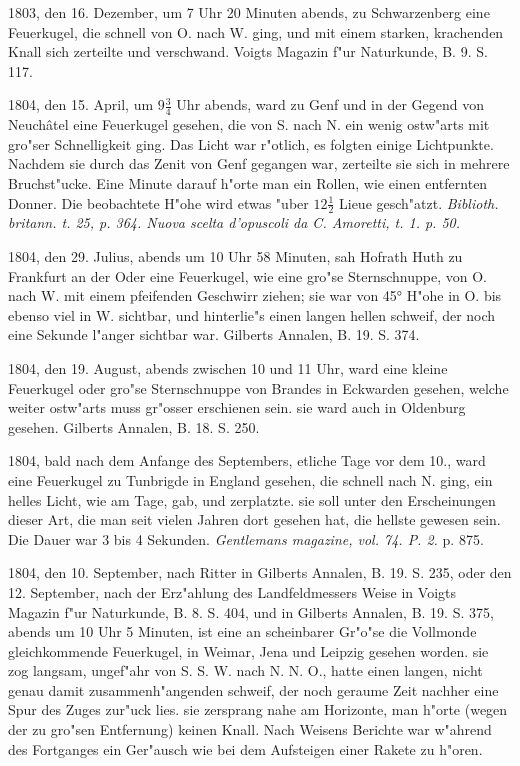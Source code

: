 \documentclass[a4paper, 11pt, oneside, polutonikogreek, german]{article}
\begin{document}
1803, den 16. Dezember, um 7 Uhr 20 Minuten abends, zu Schwarzenberg eine Feuerkugel, die schnell von O. nach W. ging, und mit einem starken, krachenden Knall sich zerteilte und verschwand. Voigts Magazin f"ur Naturkunde, B. 9. S. 117.

1804, den 15. April, um $\mathfrak{9\frac{3}{4}}$ Uhr abends, ward zu Genf und in der Gegend von Neuchâtel eine Feuerkugel gesehen, die von S. nach N. ein wenig ostw"arts mit gro"ser Schnelligkeit ging. Das Licht war r"otlich, es folgten einige Lichtpunkte. Nachdem sie durch das Zenit von Genf gegangen war, zerteilte sie sich in mehrere Bruchst"ucke. Eine Minute darauf h"orte man ein Rollen, wie einen entfernten Donner. Die beobachtete H"ohe wird etwas "uber $\mathfrak{12\frac{1}{2}}$ Lieue gesch"atzt. \emph{Biblioth. britann. t. 25, p. 364. Nuova scelta d'opuscoli da C. Amoretti, t. 1. p. 50.}

1804, den 29. Julius, abends um 10 Uhr 58 Minuten, sah Hofrath Huth zu Frankfurt an der Oder eine Feuerkugel, wie eine gro"se Sternschnuppe, von O. nach W. mit einem pfeifenden Geschwirr ziehen; sie war von 45° H"ohe in O. bis ebenso viel in W. sichtbar, und hinterlie"s einen langen hellen schweif, der noch eine Sekunde l"anger sichtbar war. Gilberts Annalen, B. 19. S. 374.

1804, den 19. August, abends zwischen 10 und 11 Uhr, ward eine kleine Feuerkugel oder gro"se Sternschnuppe von Brandes in Eckwarden gesehen, welche weiter ostw"arts muss gr"osser erschienen sein. sie ward auch in Oldenburg gesehen. Gilberts Annalen, B. 18. S. 250.

1804, bald nach dem Anfange des Septembers, etliche Tage vor dem 10., ward eine Feuerkugel zu Tunbrigde in England gesehen, die schnell nach N. ging, ein helles Licht, wie am Tage, gab, und zerplatzte. sie soll unter den Erscheinungen dieser Art, die man seit vielen Jahren dort gesehen hat, die hellste gewesen sein. Die Dauer war 3 bis 4 Sekunden. \emph{Gentlemans magazine, vol. 74. P. 2.} p. 875.

1804, den 10. September, nach Ritter in Gilberts Annalen, B. 19. S. 235, oder den 12. September, nach der Erz"ahlung des Landfeldmessers Weise in Voigts Magazin f"ur Naturkunde, B. 8. S. 404, und in Gilberts Annalen, B. 19. S. 375, abends um 10 Uhr 5 Minuten, ist eine an scheinbarer Gr"o"se die Vollmonde gleichkommende Feuerkugel, in Weimar, Jena und Leipzig gesehen worden. sie zog langsam, ungef"ahr von S. S. W. nach N. N. O., hatte einen langen, nicht genau damit zusammenh"angenden schweif, der noch geraume Zeit nachher eine Spur des Zuges zur"uck lies. sie zersprang nahe am Horizonte, man h"orte (wegen der zu gro"sen Entfernung) keinen Knall. Nach Weisens Berichte war w"ahrend des Fortganges ein Ger"ausch wie bei dem Aufsteigen einer Rakete zu h"oren.
\end{document}
